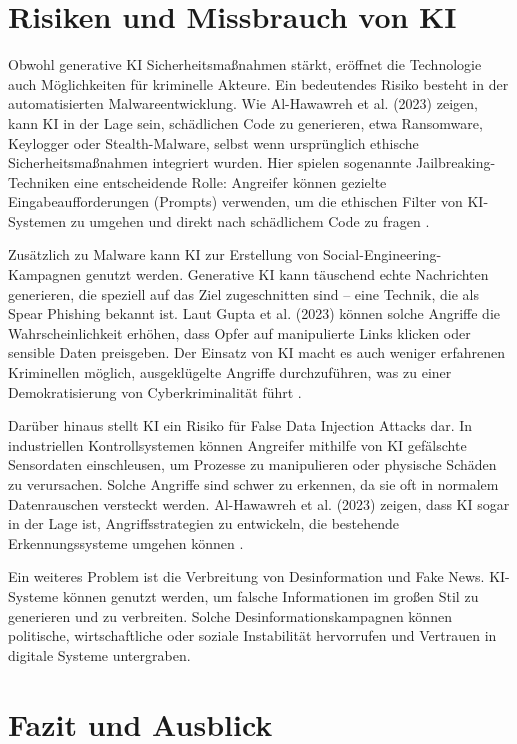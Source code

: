 \documentclass[a4paper,10pt,parskip,twocolumn]{article}
\begin{document}
\section{Risiken und Missbrauch von KI}

Obwohl generative KI Sicherheitsmaßnahmen stärkt, eröffnet die Technologie auch Möglichkeiten für kriminelle Akteure. Ein bedeutendes Risiko besteht in der automatisierten Malwareentwicklung. Wie Al-Hawawreh et al. (2023) zeigen, kann KI in der Lage sein, schädlichen Code zu generieren, etwa Ransomware, Keylogger oder Stealth-Malware, selbst wenn ursprünglich ethische Sicherheitsmaßnahmen integriert wurden​
. Hier spielen sogenannte Jailbreaking-Techniken eine entscheidende Rolle: Angreifer können gezielte Eingabeaufforderungen (Prompts) verwenden, um die ethischen Filter von KI-Systemen zu umgehen und direkt nach schädlichem Code zu fragen​
.

Zusätzlich zu Malware kann KI zur Erstellung von Social-Engineering-Kampagnen genutzt werden. Generative KI kann täuschend echte Nachrichten generieren, die speziell auf das Ziel zugeschnitten sind – eine Technik, die als Spear Phishing bekannt ist. Laut Gupta et al. (2023) können solche Angriffe die Wahrscheinlichkeit erhöhen, dass Opfer auf manipulierte Links klicken oder sensible Daten preisgeben. Der Einsatz von KI macht es auch weniger erfahrenen Kriminellen möglich, ausgeklügelte Angriffe durchzuführen, was zu einer Demokratisierung von Cyberkriminalität führt​
.

Darüber hinaus stellt KI ein Risiko für False Data Injection Attacks dar. In industriellen Kontrollsystemen können Angreifer mithilfe von KI gefälschte Sensordaten einschleusen, um Prozesse zu manipulieren oder physische Schäden zu verursachen. Solche Angriffe sind schwer zu erkennen, da sie oft in normalem Datenrauschen versteckt werden. Al-Hawawreh et al. (2023) zeigen, dass KI sogar in der Lage ist, Angriffsstrategien zu entwickeln, die bestehende Erkennungssysteme umgehen können​
.

Ein weiteres Problem ist die Verbreitung von Desinformation und Fake News. KI-Systeme können genutzt werden, um falsche Informationen im großen Stil zu generieren und zu verbreiten. Solche Desinformationskampagnen können politische, wirtschaftliche oder soziale Instabilität hervorrufen und Vertrauen in digitale Systeme untergraben​
.




\section{Fazit und Ausblick}
\end{document}

